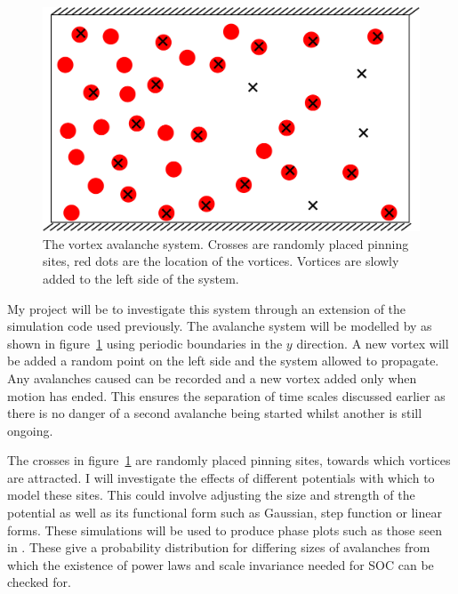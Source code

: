 \documentclass{article}
\numberwithin{equation}{section}
\begin{document}
\begin{figure}[htb]
    \centering
    \includegraphics[width=0.8\linewidth]{Reports/ProjectProposal/Resources/avalanche_system.png}
    \caption{The vortex avalanche system. Crosses are randomly placed pinning sites, red dots are the location of the vortices. Vortices are slowly added to the left side of the system.}
    \label{fig:avalanche_system}
\end{figure}
My project will be to investigate this system through an extension of the simulation code used previously. The avalanche system will be modelled by as shown in figure~\ref{fig:avalanche_system} using periodic boundaries in the $y$ direction. A new vortex will be added a random point on the left side and the system allowed to propagate. Any avalanches caused can be recorded and a new vortex added only when motion has ended. This ensures the separation of time scales discussed earlier as there is no danger of a second avalanche being started whilst another is still ongoing.

The crosses in figure~\ref{fig:avalanche_system} are randomly placed pinning sites, towards which vortices are attracted. I will investigate the effects of different potentials with which to model these sites. This could involve adjusting the size and strength of the potential as well as its functional form such as Gaussian, step function or linear forms. These simulations will be used to produce phase plots such as those seen in \cite{Field1995SuperconductingAvalanches}. These give a probability distribution for differing sizes of avalanches from which the existence of power laws and scale invariance needed for SOC can be checked for.

\printbibliography
\end{document}
